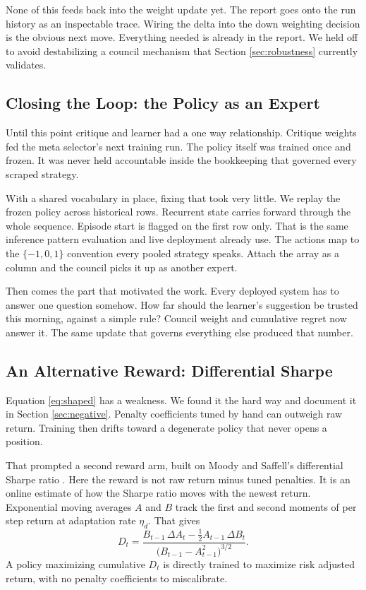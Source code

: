 \documentclass[conference]{IEEEtran}
\begin{document}
None of this feeds back into the weight update yet. The report goes onto the run history as an inspectable trace. Wiring the delta into the down weighting decision is the obvious next move. Everything needed is already in the report. We held off to avoid destabilizing a council mechanism that Section \ref{sec:robustness} currently validates.

\subsection{Closing the Loop: the Policy as an Expert}

Until this point critique and learner had a one way relationship. Critique weights fed the meta selector's next training run. The policy itself was trained once and frozen. It was never held accountable inside the bookkeeping that governed every scraped strategy.

With a shared vocabulary in place, fixing that took very little. We replay the frozen policy across historical rows. Recurrent state carries forward through the whole sequence. Episode start is flagged on the first row only. That is the same inference pattern evaluation and live deployment already use. The actions map to the $\{-1, 0, 1\}$ convention every pooled strategy speaks. Attach the array as a column and the council picks it up as another expert.

Then comes the part that motivated the work. Every deployed system has to answer one question somehow. How far should the learner's suggestion be trusted this morning, against a simple rule? Council weight and cumulative regret now answer it. The same update that governs everything else produced that number.

\subsection{An Alternative Reward: Differential Sharpe}

Equation \ref{eq:shaped} has a weakness. We found it the hard way and document it in Section \ref{sec:negative}. Penalty coefficients tuned by hand can outweigh raw return. Training then drifts toward a degenerate policy that never opens a position.

That prompted a second reward arm, built on Moody and Saffell's differential Sharpe ratio \cite{moody2001learning}. Here the reward is not raw return minus tuned penalties. It is an online estimate of how the Sharpe ratio moves with the newest return. Exponential moving averages $A$ and $B$ track the first and second moments of per step return at adaptation rate $\eta_{d}$. That gives
\begin{equation}
D_t = \frac{B_{t-1}\,\Delta A_t - \tfrac{1}{2} A_{t-1}\,\Delta B_t}{\big(B_{t-1} - A_{t-1}^2\big)^{3/2}}.
\label{eq:dsr}
\end{equation}
A policy maximizing cumulative $D_t$ is directly trained to maximize risk adjusted return, with no penalty coefficients to miscalibrate.
\end{document}
